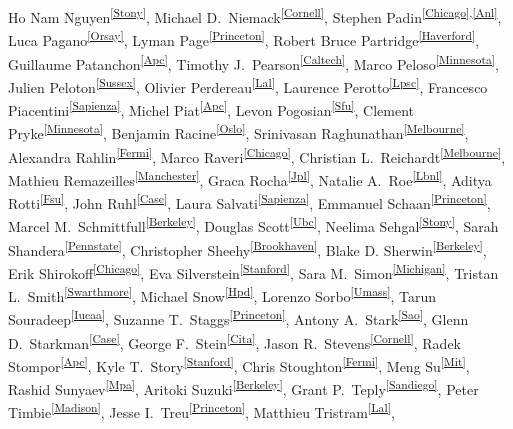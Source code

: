 Ho Nam Nguyen\textsuperscript{\ref{Stony}},
Michael D.~Niemack\textsuperscript{\ref{Cornell}},
Stephen Padin\textsuperscript{\ref{Chicago},\ref{Anl}},
Luca Pagano\textsuperscript{\ref{Orsay}},
Lyman Page\textsuperscript{\ref{Princeton}},
Robert Bruce Partridge\textsuperscript{\ref{Haverford}},
Guillaume Patanchon\textsuperscript{\ref{Apc}},
Timothy J.~Pearson\textsuperscript{\ref{Caltech}},
Marco Peloso\textsuperscript{\ref{Minnesota}},
Julien Peloton\textsuperscript{\ref{Sussex}},
Olivier Perdereau\textsuperscript{\ref{Lal}},
Laurence Perotto\textsuperscript{\ref{Lpsc}},
Francesco Piacentini\textsuperscript{\ref{Sapienza}},
Michel Piat\textsuperscript{\ref{Apc}},
Levon Pogosian\textsuperscript{\ref{Sfu}},
Clement Pryke\textsuperscript{\ref{Minnesota}},
Benjamin Racine\textsuperscript{\ref{Oslo}},
Srinivasan Raghunathan\textsuperscript{\ref{Melbourne}},
Alexandra Rahlin\textsuperscript{\ref{Fermi}},
Marco Raveri\textsuperscript{\ref{Chicago}},
Christian L.~Reichardt\textsuperscript{\ref{Melbourne}},
Mathieu Remazeilles\textsuperscript{\ref{Manchester}},
Graca Rocha\textsuperscript{\ref{Jpl}},
Natalie A.~Roe\textsuperscript{\ref{Lbnl}},
Aditya Rotti\textsuperscript{\ref{Fsu}},
John Ruhl\textsuperscript{\ref{Case}},
Laura Salvati\textsuperscript{\ref{Sapienza}},
Emmanuel Schaan\textsuperscript{\ref{Princeton}},
Marcel M.~Schmittfull\textsuperscript{\ref{Berkeley}},
Douglas Scott\textsuperscript{\ref{Ubc}},
Neelima Sehgal\textsuperscript{\ref{Stony}},
Sarah Shandera\textsuperscript{\ref{Pennstate}},
Christopher Sheehy\textsuperscript{\ref{Brookhaven}},
Blake D. Sherwin\textsuperscript{\ref{Berkeley}},
Erik Shirokoff\textsuperscript{\ref{Chicago}},
Eva Silverstein\textsuperscript{\ref{Stanford}},
Sara M.~Simon\textsuperscript{\ref{Michigan}},
Tristan L.~Smith\textsuperscript{\ref{Swarthmore}},
Michael Snow\textsuperscript{\ref{Hpd}},
Lorenzo Sorbo\textsuperscript{\ref{Umass}},
Tarun Souradeep\textsuperscript{\ref{Iucaa}},
Suzanne T.~Staggs\textsuperscript{\ref{Princeton}},
Antony A.~Stark\textsuperscript{\ref{Sao}},
Glenn D.~Starkman\textsuperscript{\ref{Case}},
George F.~Stein\textsuperscript{\ref{Cita}},
Jason R.~Stevens\textsuperscript{\ref{Cornell}},
Radek Stompor\textsuperscript{\ref{Apc}},
Kyle T.~Story\textsuperscript{\ref{Stanford}},
Chris Stoughton\textsuperscript{\ref{Fermi}},
Meng Su\textsuperscript{\ref{Mit}},
Rashid Sunyaev\textsuperscript{\ref{Mpa}},
Aritoki Suzuki\textsuperscript{\ref{Berkeley}},
Grant P.~Teply\textsuperscript{\ref{Sandiego}},
Peter Timbie\textsuperscript{\ref{Madison}},
Jesse I.~Treu\textsuperscript{\ref{Princeton}},
Matthieu Tristram\textsuperscript{\ref{Lal}},
